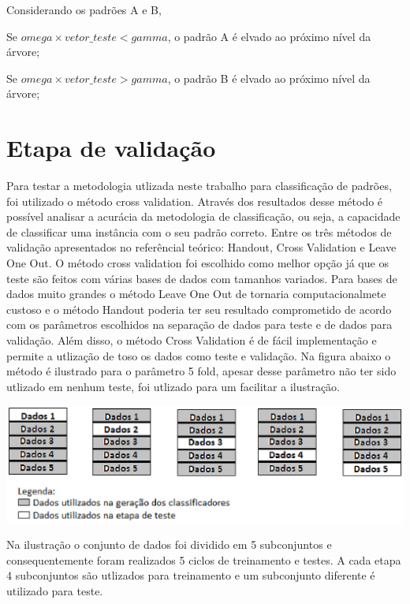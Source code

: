 Considerando os padrões A e B, 

Se $ omega \times vetor\_teste < gamma$, o padrão A é elvado ao próximo nível da árvore;

Se $ omega \times vetor\_teste > gamma$, o padrão B é elvado ao próximo nível da árvore; 

\section{Etapa de validação}
Para testar a metodologia utlizada neste trabalho para classificação de padrões, foi utilizado o método cross validation. Através dos resultados desse método é possível analisar a acurácia da metodologia de classificação, ou seja, a capacidade de classificar uma instância com o seu padrão correto.
Entre os três métodos de validação apresentados no referêncial teórico: Handout, Cross Validation e Leave One Out. O método cross validation foi escolhido como melhor opção já que os teste são feitos com várias bases de dados com tamanhos variados. Para bases de dados muito grandes o método Leave One Out de tornaria computacionalmete custoso e o método Handout poderia ter seu resultado comprometido de acordo com os parâmetros escolhidos na separação de dados para teste e de dados para validação. Além disso, o método Cross Validation é de fácil implementação e permite a utlização de toso os dados como teste e validação.
Na figura abaixo o método é ilustrado para o parâmetro 5 fold, apesar desse parâmetro não ter sido utlizado em nenhum teste, foi utlizado para um facilitar a ilustração.
\begin{center}
	\includegraphics[scale=1.0]{graficos/cross_validation}
	\label{img:cross_validation}
\end{center}

Na ilustração o conjunto de dados foi dividido em 5 subconjuntos e consequentemente foram realizados 5 ciclos de treinamento e testes. A cada etapa 4 subconjuntos são utlizados para treinamento e um subconjunto diferente é utilizado para teste. 

